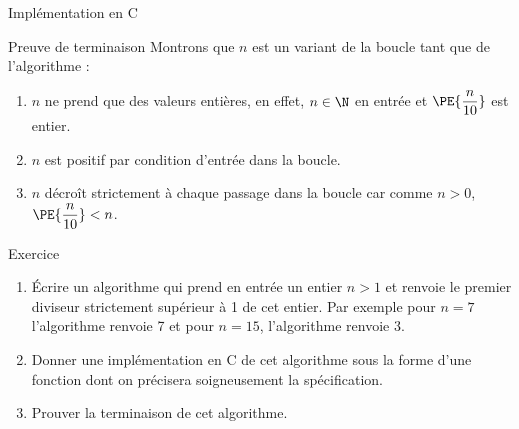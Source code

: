 \documentclass[10pt,french]{beamer}
\begin{document}
\begin{frame}{\Ctitle}{\stitle}
	\begin{exampleblock}{Implémentation en C}
	\end{exampleblock}
\end{frame}

\begin{frame}{\Ctitle}{\stitle}
	\begin{exampleblock}{Preuve de terminaison}
		Montrons que $n$ est un variant de la boucle \og tant que \fg{} de l'algorithme :
		\begin{enumerate}
		\item<1-> $n$ ne prend que des valeurs entières, en effet, $n \in \N$ en entrée et $\PE{\dfrac{n}{10}}$ est entier.
		\item<2-> $n$ est positif par condition d'entrée dans la boucle. 
		\item<3-> $n$ décroît strictement à chaque passage dans la boucle car comme $n > 0$, $\PE{\dfrac{n}{10}} < n$.
		\end{enumerate}
	\end{exampleblock}
\end{frame}



\begin{frame}{\Ctitle}{\stitle}
	\begin{exampleblock}{Exercice}
		\begin{enumerate}
		\item<1-> Écrire un algorithme qui prend en entrée un entier $n>1$ et renvoie le premier diviseur strictement supérieur à 1 de cet entier. Par exemple pour $n=7$ l'algorithme renvoie 7 et pour $n=15$, l'algorithme renvoie $3$.
		\item<2-> Donner une implémentation en C de cet algorithme sous la forme d'une fonction dont on précisera soigneusement la spécification.
		\item<3-> Prouver la terminaison de cet algorithme.
		\end{enumerate}
	\end{exampleblock}
\end{frame}
\end{document}
